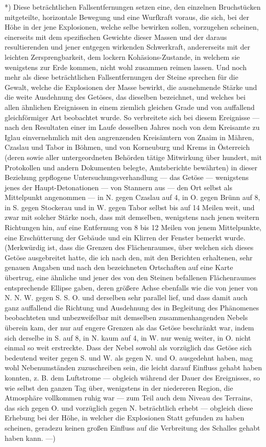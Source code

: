\documentclass[a4paper, 11pt, oneside, german]{article}
\begin{document}
*) Diese beträchtlichen Fallsentfernungen setzen eine, den einzelnen Bruchstücken mitgeteilte, horizontale Bewegung und eine Wurfkraft voraus, die sich, bei der Höhe in der jene Explosionen, welche selbe bewirken sollen, vorzugehen scheinen, einerseits mit dem spezifischen Gewichte dieser Massen und der daraus resultierenden und jener entgegen wirkenden Schwerkraft, andererseits mit der leichten Zersprengbarkeit, dem lockern Kohäsions-Zustande, in welchem sie wenigstens zur Erde kommen, nicht wohl zusammen reimen lassen. Und noch mehr als diese beträchtlichen Fallsentfernungen der Steine sprechen für die Gewalt, welche die Explosionen der Masse bewirkt, die ausnehmende Stärke und die weite Ausdehnung des Getöses, das dieselben bezeichnet, und welches bei allen ähnlichen Ereignissen in einem ziemlich gleichen Grade und von auffallend gleichförmiger Art beobachtet wurde. So verbreitete sich bei diesem Ereignisse --- nach den Resultaten einer im Laufe desselben Jahres noch von dem Kreisamte zu Iglau einvernehmlich mit den angrenzenden Kreisämtern von Znaim in Mähren, Czaslau und Tabor in Böhmen, und von Korneuburg und Krems in Österreich (deren sowie aller untergeordneten Behörden tätige Mitwirkung über hundert, mit Protokollen und andern Dokumenten belegte, Amtsberichte bewährten) in dieser Beziehung gepflogene Untersuchungsverhandlung --- das Getöse --- wenigstens jenes der Haupt-Detonationen --- von Stannern aus --- den Ort selbst als Mittelpunkt angenommen --- in N. gegen Czaslau auf 4, in O. gegen Brünn auf 8, in S. gegen Stockerau und in W. gegen Tabor selbst bis auf 14 Meilen weit, und zwar mit solcher Stärke noch, dass mit demselben, wenigstens nach jenen weitern Richtungen hin, auf eine Entfernung von 8 bis 12 Meilen von jenem Mittelpunkte, eine Erschütterung der Gebäude und ein Klirren der Fenster bemerkt wurde. (Merkwürdig ist, dass die Grenzen des Flächenraumes, über welchen sich dieses Getöse ausgebreitet hatte, die ich nach den, mit den Berichten erhaltenen, sehr genauen Angaben und nach den bezeichneten Ortschaften auf eine Karte übertrug, eine ähnliche und jener des von den Steinen befallenen Flächenraumes entsprechende Ellipse gaben, deren größere Achse ebenfalls wie die von jener von N. N. W. gegen S. S. O. und derselben sehr parallel lief, und dass damit auch ganz auffallend die Richtung und Ausdehnung des in Begleitung des Phänomenes beobachteten und unbezweifelbar mit demselben zusammenhangenden Nebels überein kam, der nur auf engere Grenzen als das Getöse beschränkt war, indem sich derselbe in S. auf 8, in N. kaum auf 4, in W. nur wenig weiter, in O. nicht einmal so weit erstreckte. Dass der Nebel sowohl als vorzüglich das Getöse sich bedeutend weiter gegen S. und W. als gegen N. und O. ausgedehnt haben, mag wohl Nebenumständen zuzuschreiben sein, die leicht darauf Einfluss gehabt haben konnten, z. B. dem Luftstrome --- obgleich während der Dauer des Ereignisses, so wie selbst den ganzen Tag über, wenigstens in der niedereren Region, die Atmosphäre vollkommen ruhig war --- zum Teil auch dem Niveau des Terrains, das sich gegen O. und vorzüglich gegen N. beträchtlich erhebt --- obgleich diese Erhebung bei der Höhe, in welcher die Explosionen Statt gefunden zu haben scheinen, geradezu keinen großen Einfluss auf die Verbreitung des Schalles gehabt haben kann. ---)  
\end{document}
